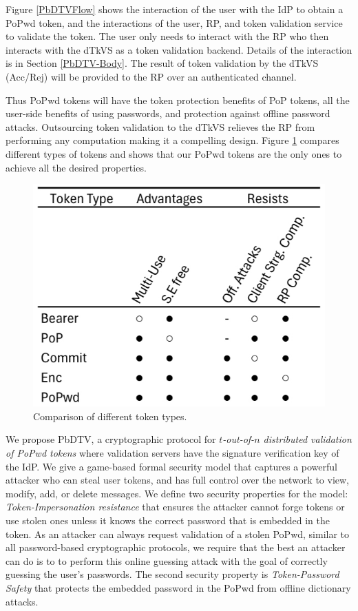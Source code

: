 \documentclass[conference]{IEEEtran}
\begin{document}
Figure \ref{PbDTVFlow} shows the interaction of the user with the IdP to obtain a PoPwd token, and the interactions of the user, RP, and token validation service to validate the token. The user only needs to interact with the RP who then interacts with the dTkVS as a token validation backend. Details of the interaction is in Section \ref{PbDTV-Body}. The result of token validation by the dTkVS (Acc/Rej) will be provided to the RP over an authenticated channel.

Thus PoPwd tokens will have the token protection benefits of PoP tokens, all the user-side benefits of using passwords, and protection against offline password attacks. Outsourcing token validation to the dTkVS relieves the RP from performing any computation
making it a compelling design. Figure \ref{token-compare} compares different types of tokens and shows that our PoPwd tokens are the only ones to achieve all the desired properties.

\begin{figure}
\begin{centering}
\includegraphics[width=.5\textwidth]{Figures/TableCompare.jpeg}
\caption{Comparison of different token types.}
\label{token-compare}
\end{centering}
\end{figure}

We propose PbDTV, a cryptographic protocol for  {\em $t$-out-of-$n$ distributed validation of PoPwd tokens} where validation servers have the signature verification key of the IdP. We give a game-based formal security model that captures a powerful attacker who can steal user tokens, and has full control over the network to view, modify, add, or delete messages. We define two security properties for the model:  {\em Token-Impersonation resistance} that ensures the attacker cannot forge tokens or use stolen ones unless it knows the correct password that is embedded in the token. As an attacker can always request validation of a stolen PoPwd, similar to all password-based cryptographic protocols, we require that the best an attacker can do is to
to perform this online guessing attack with the goal of correctly guessing the user's passwords.  The second security property is
{\em Token-Password Safety} that protects the embedded password in the PoPwd from offline dictionary attacks.
\end{document}
